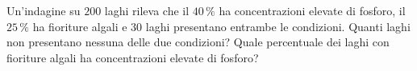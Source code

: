 \begin{esercizio}[\liv{3}]
Un'indagine su $200$ laghi rileva che il $40\,\%$ ha concentrazioni elevate di fosforo, il $25\,\%$ ha fioriture algali e $30$ laghi presentano entrambe le condizioni. Quanti laghi non presentano nessuna delle due condizioni? Quale percentuale dei laghi con fioriture algali ha concentrazioni elevate di fosforo?
\end{esercizio}

\stampasoluzioni
